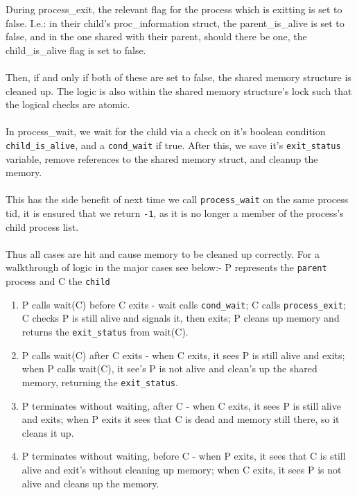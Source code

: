 \documentclass[a4wide, 11pt]{article}
\begin{document}
During process\_exit, the relevant flag for the process which is exitting is set to false. I.e.: in their child's proc\_information struct, the parent\_is\_alive is set to false, and in the one shared with their parent, should there be one, the child\_is\_alive flag is set to false.
\\\\
Then, if and only if both of these are set to false, the shared memory structure is cleaned up. The logic is also within the shared memory structure's lock such that the logical checks are atomic.
\\\\
In process\_wait, we wait for the child via a check on it's boolean condition \texttt{child\_is\_alive}, and a \texttt{cond\_wait} if true. After this, we save it's \texttt{exit\_status} variable, remove references to the shared memory struct, and cleanup the memory.
\\\\
This has the side benefit of next time we call \texttt{process\_wait} on the same process tid, it is ensured that we return \texttt{-1}, as it is no longer a member of the process's child process list.
\\\\
Thus all cases are hit and cause memory to be cleaned up correctly. For a walkthrough of logic in the major cases see below:- P represents the \texttt{parent} process and C the \texttt{child}

\begin{enumerate}
\item P calls wait(C) before C exits - wait calls \texttt{cond\_wait}; C calls \texttt{process\_exit}; C checks P is still alive and signals it, then exits; P cleans up memory and returns the \texttt{exit\_status} from wait(C).
\item P calls wait(C) after C exits - when C exits, it sees P is still alive and exits; when P calls wait(C), it see's P is not alive and clean's up the shared memory, returning the \texttt{exit\_status}.
\item P terminates without waiting, after C - when C exits, it sees P is still alive and exits; when P exits it sees that C is dead and memory still there, so it cleans it up.
\item P terminates without waiting, before C - when P exits, it sees that C is still alive and exit's without cleaning up memory; when C exits, it sees P is not alive and cleans up the memory.
\end{enumerate}
\end{document}
